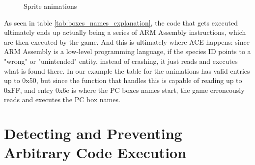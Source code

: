 \documentclass[a4paper]{usiinfbachelorproject}
\begin{document}
\begin{figure}[!htb]
	\centering
	\label{fig:First frame of the hatching animation}
	\qquad
	\label{fig:Second frame of the hatching animation}
	\qquad
	\label{fig:Final frame of the hatching animation}
	\caption{Sprite animations}
	\label{fig:sprite_animation}
\end{figure}


As seen in table \ref{tab:boxes_names_explanation}, the code that gets executed ultimately ends up actually being a series of ARM Assembly instructions, which are then executed by the game. And this is ultimately where ACE happens: since ARM Assembly is a low-level programming language, if the species ID points to a "wrong" or "unintended" entity, instead of crashing, it just reads and executes what is found there. In our example the table for the animations has valid entries up to 0x50, but since the function that handles this is capable of reading up to 0xFF, and entry 0x6e is where the PC boxes names start, the game erroneously reads and executes the PC box names.



\section{Detecting and Preventing Arbitrary Code Execution}
\label{sec:state_of_the_art}
\end{document}

